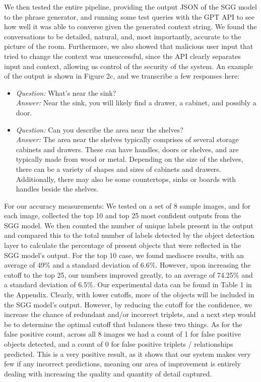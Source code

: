 \documentclass[letterpaper, 10 pt, conference]{ieeeconf}  %
\begin{document}
\begin{figure}
    \end{figure}

    We then tested the entire pipeline, providing the output JSON of the SGG model to the phrase generator, and running some test queries with the GPT API to see how well it was able to converse given the generated context string. We found the conversations to be detailed, natural, and, most importantly, accurate to the picture of the room. Furthermore, we also showed that malicious user input that tried to change the context was unsuccessful, since the API clearly separates input and context, allowing us control of the security of the system. An example of the output is shown in Figure 2c, and we transcribe a few responses here:
    \begin{itemize}
        \item \textit{Question:} What's near the sink? \\ \textit{Answer:} Near the sink, you will likely find a drawer, a cabinet, and possibly a door.
        \item \textit{Question:} Can you describe the area near the shelves? \\ \textit{Answer:} The area near the shelves typically comprises of several storage cabinets and drawers. These can have handles, doors or shelves, and are typically made from wood or metal. Depending on the size of the shelves, there can be a variety of shapes and sizes of cabinets and drawers. Additionally, there may also be some countertops, sinks or boards with handles beside the shelves.
    \end{itemize}

    For our accuracy measurements:
    We tested on a set of 8 sample images, and for each image, collected the top 10 and top 25 most confident outputs from the SGG model. We then counted the number of unique labels present in the output and compared this to the total number of labels detected by the object detection layer to calculate the percentage of present objects that were reflected in the SGG model's output. For the top 10 case, we found mediocre results, with an average of 49\% and a standard deviation of 6.6\%. However, upon increasing the cutoff to the top 25, our numbers improved greatly, to an average of 74.25\% and a standard deviation of 6.5\%. Our experimental data can be found in Table 1 in the Appendix. Clearly, with lower cutoffs, more of the objects will be included in the SGG model's output. However, by reducing the cutoff for the confidence, we increase the chance of redundant and/or incorrect triplets, and a next step would be to determine the optimal cutoff that balances these two things. As for the false positive count, across all 8 images we had a count of 1 for false positive objects detected, and a count of 0 for false positive triplets / relationships predicted. This is a very positive result, as it shows that our system makes very few if any incorrect predictions, meaning our area of improvement is entirely dealing with increasing the quality and quantity of detail captured.
\end{document}
